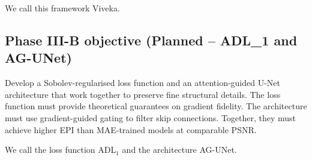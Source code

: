 We call this framework Viveka.

\subsection{Phase III-B objective (Planned – ADL\_1 and AG-UNet)}

Develop a Sobolev-regularised loss function and an attention-guided U-Net architecture that work together to preserve fine structural details. The loss function must provide theoretical guarantees on gradient fidelity. The architecture must use gradient-guided gating to filter skip connections. Together, they must achieve higher EPI than MAE-trained models at comparable PSNR.

We call the loss function ADL\(_1\) and the architecture AG-UNet.



